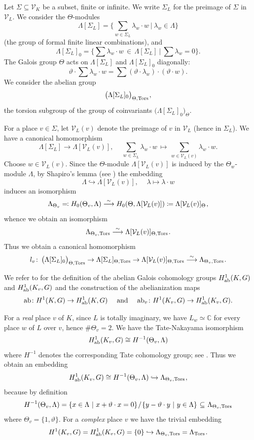 \documentclass[11pt]{amsart}
\renewcommand{\mathbb}{\mathds}
\theoremstyle{plain}
\theoremstyle{definition}
\newcommand{\C}{{\mathbb C}}
\newcommand{\into}{\hookrightarrow}
\newcommand{\ab}{{\rm ab}}
\newcommand{\isoto}{\overset{\sim}{\longrightarrow}}
\newcommand{\hs}{\kern 0.8pt}
\newcommand{\V}{{\mathcal V}}
\newcommand{\Tors}{{\rm Tors}}
\newcommand{\Thv}{{\Theta_v}}
\newcommand{\Thvt}{{\Theta_v,\Tors}}
\newcommand{\Tht}{{\Theta,\Tors}}
\newcommand{\vt}{{\vartheta}}
\begin{document}
Let $\Sigma\subseteq\V_K$ be a subset, finite or infinite.
We write $\Sigma_L$ for the preimage of $\Sigma$ in $\V_L$.
We consider the $\Theta$-modules
\[\Lambda[\Sigma_L]=\Big\{\sum_{w\in\Sigma_L} \lambda_w\cdot w\  \big|\ \lambda_w\in \Lambda\Big\} \]
(the group of formal finite linear combinations), and
\[ \Lambda[\Sigma_L]_0=\Big\{\sum \lambda_w\cdot w\,\in\, \Lambda[\Sigma_L]\ \big|\ \sum \lambda_w=0\Big\}.\]
The Galois group $\Theta$ acts on $\Lambda[\Sigma_L]$ and $\Lambda[\Sigma_L]_0$
diagonally:
\[\vt\cdot \sum \lambda_w\cdot w=
\sum(\vt\cdot \lambda_w)\cdot (\vt\cdot w).
\]
We consider the abelian group
\[ \big(\Lambda[\Sigma_L]_0\big)_{\Theta,\Tors}\hs,\]
the torsion subgroup of the group of coinvariants $\big(\Lambda[\Sigma_L]_0\big)_{\Theta}.$

For a place $v\in\Sigma$, let $\V_L(v)$ denote the preimage of $v$ in $\V_L$ (hence in $\Sigma_L$).
We have a canonical homomorphism
\[\Lambda[\Sigma_L]\to \Lambda[\V_L(v)], \quad\
   \sum_{w\in \Sigma_L}\lambda_w\cdot w\,\mapsto\, \sum_{w\in \V_L(v)} \lambda_w\cdot w.\]
Choose $w\in\V_L(v)$.
Since the $\Theta$-module $\Lambda[\V_L(v)]$ is induced by the $\Theta_w$-module $\Lambda$, by Shapiro's lemma
(see \cite[Proposition 9.76(ii)]{Rotman})
the embedding
\[ \Lambda\into \Lambda[\V_L(v)],\quad\ \lambda\mapsto \lambda\cdot w \]
induces an isomorphism
\[\Lambda_{\Theta_v}\eqqcolon H_0(\Theta_v,\Lambda)\isoto H_0(\Theta,\Lambda[\V_L(v)])\coloneqq \Lambda[\V_L(v)]_\Theta\hs,\]
whence we obtain an isomorphism
\[ \Lambda_\Thvt\isoto \Lambda[\V_L(v)]_\Tht\hs.\]
Thus we obtain a canonical homomorphism
\begin{equation}\label{e:lv}
l_v\colon\,\big(\Lambda[\Sigma_L]_0\big)_{\Theta,\Tors}
    \to \Lambda[\Sigma_L]_{\Theta,\Tors}\to
   \Lambda[\V_L(v)]_{\Theta,\Tors}\overset\sim\longrightarrow \Lambda_{\Thv,\Tors}\hs.
\end{equation}

We refer to \cite[Chapter 5]{BK}
for the definition of the abelian Galois cohomology groups
$H^1_\ab(K,G)$ and $H^1_\ab(K_v,G)$
and the construction of the abelianization maps
\[ \ab\colon H^1(K,G)\to H^1_\ab(K,G)\quad\ \text{and}
    \quad\ \ab_v\colon H^1(K_v,G)\to H^1_\ab(K_v,G).\]

For a {\em real} place $v$ of $K$, since $L$ is totally imaginary, we have
$L_w\simeq\C$ for every place $w$ of $L$ over $v$, hence $\#\Theta_v=2$.
We have the Tate-Nakayama isomorphism
\begin{equation}\label{e:ab-real}
H^1_\ab(K_v,G)\cong H^{-1}(\Theta_v,\Lambda)
\end{equation}
where $H^{-1}$ denotes the corresponding Tate cohomology group;
see \cite[Proposition 8.21]{BT}.
Thus we obtain an embedding
\[H^1_\ab(K_v,G)\cong H^{-1}(\Theta_v,\Lambda)\into \Lambda_{\Theta_v,\Tors}\hs,\]
because by definition
\[H^{-1}(\Theta_v,\Lambda)=\{x\in \Lambda \ |\ x+\vt\cdot x=0\}\hs/\hs\{y-\vt\cdot y\ |\ y\in \Lambda\}\hs\subseteq\hs \Lambda_{\Theta_v,\Tors}\]
where $\Theta_v=\{1,\vt\}$.
For a {\em complex} place $v$ we have the trivial embedding
\[H^1(K_v,G)=H^1_\ab(K_v,G)=\{0\}\into \Lambda_\Thvt=\Lambda_\Tors\hs.\]
\end{document}
